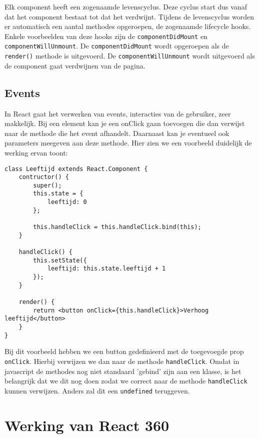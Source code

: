 Elk component heeft een zogenaamde levenscyclus. Deze cyclus start dus vanaf dat het component bestaat tot dat het verdwijnt. Tijdens de levenscyclus worden er automatisch een aantal methodes opgeroepen, de zogenaamde lifecycle hooks. Enkele voorbeelden van deze hooks zijn de \lstinline[basicstyle=\ttfamily\color{red}]|componentDidMount| en \lstinline[basicstyle=\ttfamily\color{red}]|componentWillUnmount|. De \lstinline[basicstyle=\ttfamily\color{red}]|componentDidMount| wordt opgeroepen als de \lstinline[basicstyle=\ttfamily\color{red}]|render()| methode is uitgevoerd. De \lstinline[basicstyle=\ttfamily\color{red}]|componentWillUnmount| wordt uitgevoerd als de component gaat verdwijnen van de pagina.

\subsection{Events}
\label{subsec:events}
In React gaat het verwerken van events, interacties van de gebruiker, zeer makkelijk. Bij een element kan je een onClick gaan toevoegen die dan verwijst naar de methode die het event afhandelt. Daarnaast kan je eventueel ook parameters meegeven aan deze methode. Hier zien we een voorbeeld duidelijk de werking ervan toont:

\begin{lstlisting}[frame=single, caption=Een event afhandelen]
class Leeftijd extends React.Component {
	contructor() {
		super();
		this.state = {
			leeftijd: 0
		};
		
		this.handleClick = this.handleClick.bind(this);
	}
	
	handleClick() {
		this.setState({
			leeftijd: this.state.leeftijd + 1
		});
	}

	render() {
		return <button onClick={this.handleClick}>Verhoog leeftijd</button>
	}
}
\end{lstlisting}

Bij dit voorbeeld hebben we een button gedefinieerd met de toegevoegde prop \lstinline[basicstyle=\ttfamily\color{red}]|onClick|. Hierbij verwijzen we dan naar de methode \lstinline[basicstyle=\ttfamily\color{red}]|handleClick|. Omdat in javascript de methodes nog niet standaard 'gebind' zijn aan een klasse, is het belangrijk dat we dit nog doen zodat we correct naar de methode \lstinline[basicstyle=\ttfamily\color{red}]|handleClick| kunnen verwijzen. Anders zal dit een \lstinline[basicstyle=\ttfamily\color{red}]|undefined| teruggeven.

\section{Werking van React 360}
\label{sec:werking-react360}

